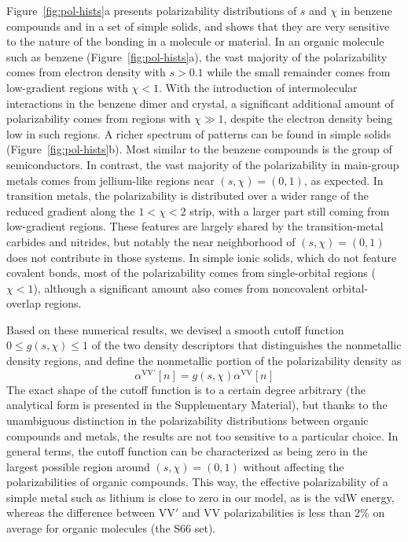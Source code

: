 Figure~\ref{fig:pol-hists}a presents polarizability distributions of $s$ and $\chi$ in benzene compounds and in a set of simple solids, and shows that they are very sensitive to the nature of the bonding in a molecule or material.
In an organic molecule such as benzene (Figure~\ref{fig:pol-hists}a), the vast majority of the polarizability
comes from electron density with $s>0.1$ while the small remainder comes
from low-gradient regions with $\chi<1$.
With the introduction of intermolecular interactions in the benzene dimer and crystal, a significant additional amount of polarizability comes from regions with $\chi\gg1$, despite the electron density being low in such regions.
A richer spectrum of patterns can be found in simple solids (Figure~\ref{fig:pol-hists}b).
Most similar to the benzene compounds is the group of semiconductors.
In contrast, the vast majority of the polarizability in main-group metals comes from jellium-like regions near $(s,\chi)=(0,1)$, as expected.
In transition metals, the polarizability is distributed over a wider range of the reduced gradient along the $1<\chi<2$ strip, with a larger part still coming from low-gradient regions.
These features are largely shared by the transition-metal carbides and nitrides, but notably the near neighborhood of $(s,\chi)=(0,1)$ does not contribute in those systems.
In simple ionic solids, which do not feature covalent bonds, most of the
polarizability comes from single-orbital regions ($\chi<1$), although a
significant amount also comes from noncovalent orbital-overlap regions.

Based on these numerical results, we devised a smooth cutoff function $0\leq g(s,\chi)\leq 1$ of the two density descriptors that distinguishes the nonmetallic density regions, and define the nonmetallic portion of the polarizability density as
\begin{equation}
  \alpha^\mathrm{VV'}[n]=g(s,\chi)\alpha^\text{VV}[n]
\end{equation}
The exact shape of the cutoff function is to a certain degree arbitrary (the analytical form is presented in the Supplementary Material), but thanks to the unambiguous distinction in the polarizability distributions between organic compounds and metals, the results are not too sensitive to a particular choice.
In general terms, the cutoff function can be characterized as being zero in the largest possible region around $(s,\chi)=(0,1)$ without affecting the polarizabilities of organic compounds.
This way, the effective polarizability of a simple metal such as lithium is close to zero in our model, as is the vdW energy, whereas the difference between VV$'$ and VV polarizabilities is less than 2\% on average for organic molecules (the S66 set).


